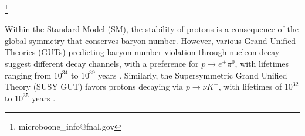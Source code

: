 \documentclass[aps,prd,longbibliography,twocolumn,showpacs,superscriptaddress,floatfix,10pt]{revtex4-1}
\begin{document}
\thanks{microboone\_info@fnal.gov}\noaffiliation

\begin{abstract}

The MicroBooNE experiment is an 85 tonne active mass liquid argon time projection chamber neutrino detector exposed to the on-axis Booster Neutrino Beam (BNB) at Fermilab. One of MicroBooNE's physics goals is the precise measurement of neutrino interactions on argon in the 1 GeV energy regime. Building on the capabilities of the MicroBooNE detector, this analysis identifies $K^{+}$ mesons, a key signature for the study of strange particle production in neutrino interactions. This measurement is furthermore valuable for background estimation for future nucleon decay searches and for improved reconstruction and particle identification capabilities in experiments such as the Deep Underground Neutrino Experiment (DUNE). In this letter, we present the first-ever measurement of a flux-integrated cross section for charged-current muon neutrino induced $K^{+}$ production on argon nuclei, determined to be 7.93 $\pm$ 3.22 (stat.) $\pm$ 2.83 (syst.) $\times~10^{-42}\;$ cm$^2$/nucleon based on an analysis of 6.88$\times10^{20}$ protons on target. This result was found to be consistent with model predictions from different neutrino event generators within the reported uncertainties.

\end{abstract}

\maketitle
Within the Standard Model (SM), the stability of protons is a consequence of the global symmetry that conserves baryon number. However, various Grand Unified Theories (GUTs) predicting baryon number violation through nucleon decay suggest different decay channels, with a preference for $p \rightarrow e^{+} \pi^{0}$, with lifetimes ranging from $10^{34}$ to $10^{39}$ years \cite{PhysRevLett.32.438}. Similarly, the Supersymmetric Grand Unified Theory (SUSY GUT) favors protons decaying via $p \rightarrow \nu K^{+}$, with lifetimes of $10^{32}$ to $10^{35}$ years \cite{Hisano:1992jj}.
\end{document}
